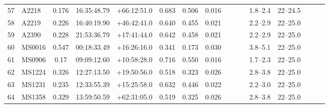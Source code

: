 \documentclass[useAMS,usenatbib]{mnras}
\begin{document}
\begin{table}
\begin{tabular*}{1.0\textwidth}{ l l c c c r c c c c c c c c l l }
57 & A2218 & 0.176 & 16:35:48.79 & +66:12:51.0 & 0.683 & 0.506 & 0.016 \hspace{8pt}& & & \hspace{8pt}& 1.8--2.4 \hspace{8pt}& 22--24.5 \\
58 & A2219 & 0.226 & 16:40:19.90 & +46:42:41.0 & 0.640 & 0.455 & 0.021 \hspace{8pt}& & & \hspace{8pt}& 2.2--2.9 \hspace{8pt}& 22--25.0 \\
59 & A2390 & 0.228 & 21:53:36.79 & +17:41:44.0 & 0.642 & 0.458 & 0.021 \hspace{8pt}& & & \hspace{8pt}& 2.2--2.9 \hspace{8pt}& 22--25.0 \\
60 & MS0016 & 0.547 & 00:18:33.49 & +16:26:16.0 & 0.341 & 0.173 & 0.030 \hspace{8pt}& & & \hspace{8pt}& 3.8--5.1 \hspace{8pt}& 22--25.0 \\
61 & MS0906 & 0.17 & 09:09:12.60 & +10:58:28.0 & 0.716 & 0.550 & 0.016 \hspace{8pt}& & & \hspace{8pt}& 1.7--2.3 \hspace{8pt}& 22--25.0 \\
62 & MS1224 & 0.326 & 12:27:13.50 & +19:50:56.0 & 0.518 & 0.323 & 0.026 \hspace{8pt}& & & \hspace{8pt}& 2.8--3.8 \hspace{8pt}& 22--25.0 \\
63 & MS1231 & 0.235 & 12:33:55.39 & +15:25:58.0 & 0.632 & 0.446 & 0.022 \hspace{8pt}& & & \hspace{8pt}& 2.2--3.0 \hspace{8pt}& 22--25.0 \\
64 & MS1358 & 0.329 & 13:59:50.59 & +62:31:05.0 & 0.519 & 0.325 & 0.026 \hspace{8pt}& & & \hspace{8pt}& 2.8--3.8 \hspace{8pt}& 22--25.0 \\


 \end{tabular*}
\end{table}

 
\end{document}
